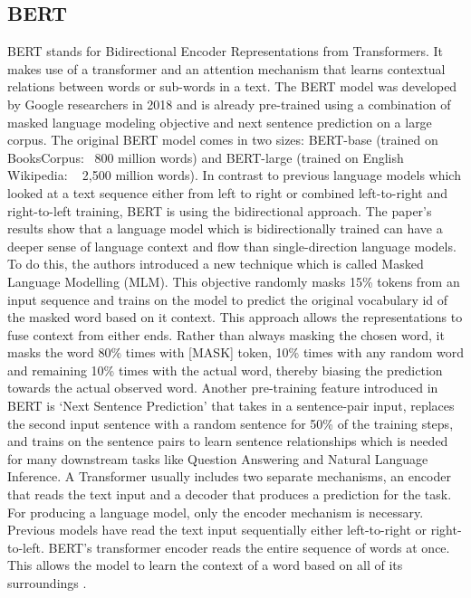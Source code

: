 \subsection{BERT} \label{bert}
BERT  stands  for  Bidirectional Encoder Representations from Transformers. It makes use of a transformer and an attention mechanism that learns contextual relations between words or sub-words in a text. The BERT model was developed by Google researchers in 2018 and is already pre-trained using a combination of masked language modeling objective and next sentence prediction on a large corpus. The original BERT model comes in two sizes: BERT-base (trained on BooksCorpus: ~800 million words) and BERT-large (trained on English Wikipedia: ~ 2,500 million words). 
In contrast to previous language models which looked at a text sequence either from left to right or combined left-to-right and right-to-left training, BERT is using the bidirectional approach. The paper’s results show that a language model which is bidirectionally trained can have a deeper sense of language context and flow than single-direction language models. To do this, the authors introduced a new technique which is called Masked Language Modelling (MLM). \alert{This objective randomly masks 15\% tokens from an input sequence and trains on the model to predict the original vocabulary id of the masked word based on it context. This approach allows the representations to fuse context from either ends. Rather than always masking the chosen word, it masks the word 80\% times with [MASK] token, 10\% times with any random word and remaining 10\% times with the actual word, thereby biasing the prediction towards the actual observed word. Another pre-training feature introduced in BERT is ‘Next Sentence Prediction’ that takes in a sentence-pair input, replaces the second input sentence with a random sentence for 50\% of the training steps, and trains on the sentence pairs to learn sentence relationships which is needed for many downstream tasks like Question Answering and Natural Language Inference.} \newline
A Transformer usually includes two separate mechanisms, an encoder that reads the text input and a decoder that produces a prediction for the task. For producing a language model, only the encoder mechanism is necessary. Previous models have read the text input sequentially either left-to-right or right-to-left. BERT's transformer encoder reads the entire sequence of words at once. This allows the model to learn the context of a word based on all of its surroundings\alert{ \cite{Devlin}}.  \newline
